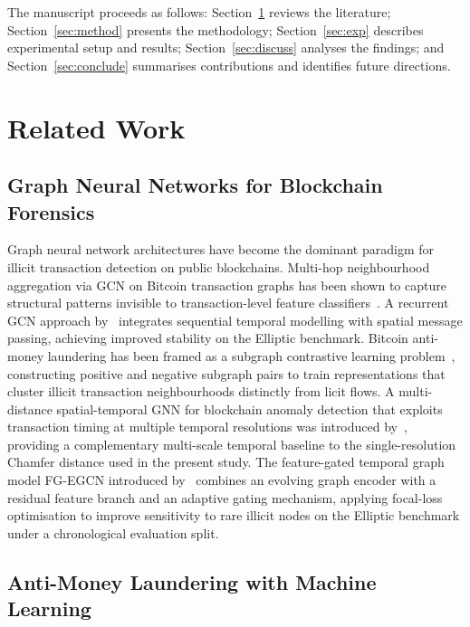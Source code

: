 \documentclass[12pt,a4paper]{article}
\begin{document}
The manuscript proceeds as follows: Section~\ref{sec:related}
reviews the literature; Section~\ref{sec:method} presents
the methodology; Section~\ref{sec:exp} describes experimental
setup and results; Section~\ref{sec:discuss} analyses the
findings; and Section~\ref{sec:conclude} summarises
contributions and identifies future directions.

\section{Related Work}
\label{sec:related}

\subsection{Graph Neural Networks for Blockchain Forensics}

Graph neural network architectures have become the dominant
paradigm for illicit transaction detection on public
blockchains. Multi-hop neighbourhood aggregation via GCN on
Bitcoin transaction graphs has been shown to capture
structural patterns invisible to transaction-level feature
classifiers~\citep{asiri2025}. A recurrent GCN
approach by~\citep{alarab2024} integrates sequential temporal
modelling with spatial message passing, achieving improved
stability on the Elliptic benchmark. Bitcoin anti-money
laundering has been framed as a subgraph contrastive learning
problem~\citep{ouyang2024btc}, constructing positive
and negative subgraph pairs to train representations that
cluster illicit transaction neighbourhoods distinctly from
licit flows. A multi-distance spatial-temporal GNN for
blockchain anomaly detection that exploits transaction timing
at multiple temporal resolutions was introduced
by~\citep{chen2025multi}, providing a complementary
multi-scale temporal baseline to the single-resolution
Chamfer distance used in the present study. The feature-gated
temporal graph model FG-EGCN introduced
by~\citep{han2026fg} combines an evolving graph encoder with
a residual feature branch and an adaptive gating mechanism,
applying focal-loss optimisation to improve sensitivity to
rare illicit nodes on the Elliptic benchmark under a
chronological evaluation split.

\subsection{Anti-Money Laundering with Machine Learning}
\end{document}
